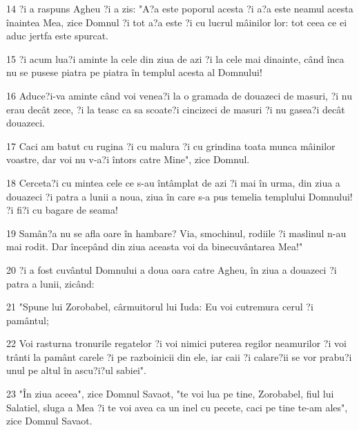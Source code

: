 \par 14 ?i a raspuns Agheu ?i a zis: "A?a este poporul acesta ?i a?a este neamul acesta înaintea Mea, zice Domnul ?i tot a?a este ?i cu lucrul mâinilor lor: tot ceea ce ei aduc jertfa este spurcat.
\par 15 ?i acum lua?i aminte la cele din ziua de azi ?i la cele mai dinainte, când înca nu se pusese piatra pe piatra în templul acesta al Domnului!
\par 16 Aduce?i-va aminte când voi venea?i la o gramada de douazeci de masuri, ?i nu erau decât zece, ?i la teasc ca sa scoate?i cincizeci de masuri ?i nu gasea?i decât douazeci.
\par 17 Caci am batut cu rugina ?i cu malura ?i cu grindina toata munca mâinilor voastre, dar voi nu v-a?i întors catre Mine", zice Domnul.
\par 18 Cerceta?i cu mintea cele ce s-au întâmplat de azi ?i mai în urma, din ziua a douazeci ?i patra a lunii a noua, ziua în care s-a pus temelia templului Domnului! ?i fi?i cu bagare de seama!
\par 19 Samân?a nu se afla oare în hambare? Via, smochinul, rodiile ?i maslinul n-au mai rodit. Dar începând din ziua aceasta voi da binecuvântarea Mea!"
\par 20 ?i a fost cuvântul Domnului a doua oara catre Agheu, în ziua a douazeci ?i patra a lunii, zicând:
\par 21 "Spune lui Zorobabel, cârmuitorul lui Iuda: Eu voi cutremura cerul ?i pamântul;
\par 22 Voi rasturna tronurile regatelor ?i voi nimici puterea regilor neamurilor ?i voi trânti la pamânt carele ?i pe razboinicii din ele, iar caii ?i calare?ii se vor prabu?i unul pe altul în ascu?i?ul sabiei".
\par 23 "În ziua aceea", zice Domnul Savaot, "te voi lua pe tine, Zorobabel, fiul lui Salatiel, sluga a Mea ?i te voi avea ca un inel cu pecete, caci pe tine te-am ales", zice Domnul Savaot.


